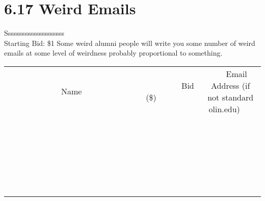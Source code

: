 \documentclass[11pt]{article}
\begin{document}
\section*{6.17 Weird Emails}
Sssssssssssssssssssss
\\
Starting Bid: \$1
\newline
Some weird alumni people will write you some number of weird emails at some level of weirdness probably proportional to something.
\\[6ex]
\begin{tabular}{c c c}
~~~~~~~~~~~~~Name~~~~~~~~~~~~~ & ~~~~~~~~~Bid (\$)~~~~~~~~~  & ~~~Email Address (if not standard olin.edu)~~~\\
 & & \\
\hline
 & & \\
\hline
 & & \\
\hline
 & & \\
\hline
 & & \\
\hline
 & & \\
\hline
 & & \\
\hline
 & & \\
\hline
 & & \\
\hline
 & & \\
\hline
 & & \\
\hline
 & & \\
\hline
 & & \\
\hline
 & & \\
\hline
 & & \\
\hline
 & & \\
\hline
 & & \\
\hline
 & & \\
\hline
 & & \\
\hline
 & & \\
\hline
 & & \\
\hline
 & & \\
\hline
 & & \\
\hline
 & & \\
\hline
 & & \\
\hline
 & & \\
\hline
\end{tabular}
\newpage
\end{document}
